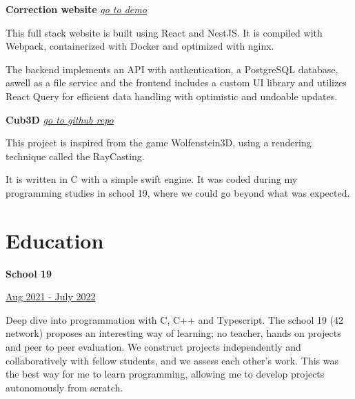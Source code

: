\documentclass[11pt, oneside, a4paper, titlepage]{article}
\begin{document}
\begin{tcolorbox}[colframe=white, colback=white]
\begin{minipage}[t]{0.60\linewidth}
    \vspace{0.4cm}

    \textbf{Correction website} 
    \emph{
      \href{https://tamighi.github.io/work/correction-website-demo}{\underline{go to demo}}
    }
    \medbreak

    \small{
      This full stack website is built using React and NestJS. It is compiled 
      with Webpack, containerized with Docker and optimized with nginx.

      The backend implements an API with authentication, a PostgreSQL database, 
      aswell as a file service and the frontend includes a custom UI library and 
      utilizes React Query for efficient data handling with optimistic and 
      undoable updates.
    }
    \vspace{0.4cm}

    \textbf{Cub3D}
    \emph{
      \href{https://github.com/Lysique/cub3d}{\underline{go to github repo}}
    }
    \medbreak

    This project is inspired from the game Wolfenstein3D, using a rendering 
    technique called the RayCasting. \medbreak

    It is written in C with a simple swift engine. It was coded during my 
    programming studies in school 19, where we could go beyond what was expected.
    \section*{Education}

    \begin{minipage}{0.45\linewidth}
      \textbf{School 19}
    \end{minipage}
    \begin{minipage}{0.5\linewidth}
      \begin{flushright}
        \underline{Aug 2021 - July 2022}
      \end{flushright}
    \end{minipage}
    \vspace{0.4cm}

    \small{
      Deep dive into programmation with C, C++ and Typescript. The school 19 
      (42 network) proposes an interesting way of learning; no teacher, hands 
      on projects and peer to peer evaluation. We construct projects 
      independently and collaboratively with fellow students, and we assess 
      each other's work.
      This was the best way for me to learn programming, allowing me to develop 
      projects autonomously from scratch.
    }
    \vspace{0.2cm}


\end{minipage}
\end{tcolorbox}
\end{document}
